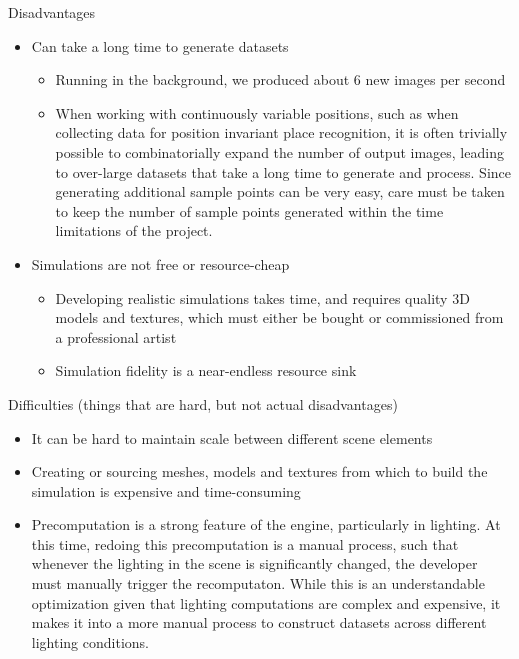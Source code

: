 \documentclass[letterpaper, 10 pt, conference]{ieeeconf}  %
\begin{document}
Disadvantages
\begin{itemize}
    \item Can take a long time to generate datasets
    \begin{itemize}
        \item Running in the background, we produced about 6 new images per second
        \item When working with continuously variable positions, such as when collecting data for position invariant place recognition, it is often trivially possible to combinatorially expand the number of output images, leading to over-large datasets that take a long time to generate and process. Since generating additional sample points can be very easy, care must be taken to keep the number of sample points generated within the time limitations of the project.
    \end{itemize}
    \item Simulations are not free or resource-cheap
    \begin{itemize}
        \item Developing realistic simulations takes time, and requires quality 3D models and textures, which must either be bought or commissioned from a professional artist
        \item Simulation fidelity is a near-endless resource sink
    \end{itemize}
\end{itemize}

Difficulties (things that are hard, but not actual disadvantages)
\begin{itemize}
    \item It can be hard to maintain scale between different scene elements
    \item Creating or sourcing meshes, models and textures from which to build the simulation is expensive and time-consuming
    \item Precomputation is a strong feature of the engine, particularly in lighting. At this time, redoing this precomputation is a manual process, such that whenever the lighting in the scene is significantly changed, the developer must manually trigger the recomputaton. While this is an understandable optimization given that lighting computations are complex and expensive, it makes it into a more manual process to construct datasets across different lighting conditions.
\end{itemize}
\end{document}
